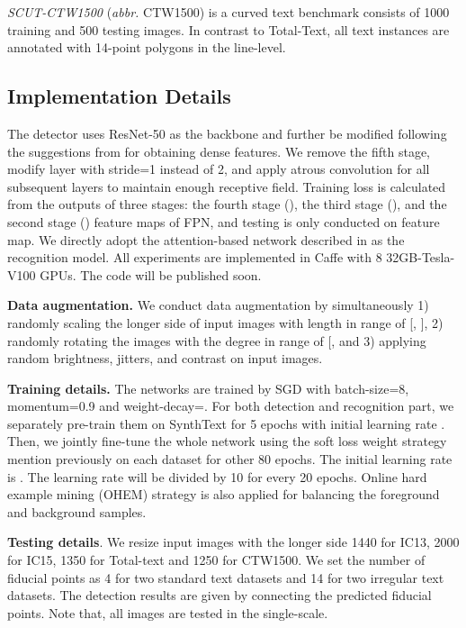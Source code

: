 \documentclass[letterpaper]{article} \usepackage{aaai20}  \usepackage{times}  \usepackage{helvet} \usepackage{courier}  \usepackage[hyphens]{url}  \usepackage{graphicx} \urlstyle{rm} \def\UrlFont{\rm}  \usepackage{graphicx}  \frenchspacing  \setlength{\pdfpagewidth}{8.5in}  \setlength{\pdfpageheight}{11in}  \usepackage{amsmath}
\begin{document}
\emph{SCUT-CTW1500} \cite{liu2019curved} (\emph{abbr.} CTW1500) is a curved text benchmark consists of 1000 training and 500 testing images.
In contrast to Total-Text, all text instances are annotated with 14-point polygons in the line-level.

\subsection{Implementation Details}

The detector uses ResNet-50 as the backbone and further be modified following the suggestions from \cite{huang2017speed} for obtaining dense features.
We remove the fifth stage, modify  layer with stride=1 instead of 2, and apply atrous convolution for all subsequent layers to maintain enough receptive field.
Training loss is calculated from the outputs of three stages: the fourth stage (), the third stage (), and the second stage () feature maps of FPN, and testing is only conducted on  feature map.
We directly adopt the attention-based network described in \cite{cheng2017focus} as the recognition model.
All experiments are implemented in Caffe with 8 32GB-Tesla-V100 GPUs. The code will be published soon.


\textbf{Data augmentation.}
We conduct data augmentation by simultaneously 1) randomly scaling the longer side of input images with length in range of [, ],  2) randomly rotating the images with the degree in range of [, and 3) applying random brightness, jitters, and contrast on input images.

\textbf{Training details.}
The networks are trained by SGD with batch-size=8, momentum=0.9 and weight-decay=. For both detection and recognition part, we separately pre-train them on SynthText for 5 epochs with initial learning rate . Then, we jointly fine-tune the whole network using the soft loss weight strategy mention previously on each dataset for other 80 epochs. The initial learning rate is  . The learning rate will be divided by 10 for every 20 epochs.
Online hard example mining (OHEM) \cite{shrivastava2016training} strategy is also applied for balancing the foreground and background samples.

\textbf{Testing details}.
We resize input images with the longer side 1440 for IC13, 2000 for IC15,  1350 for Total-text and 1250 for CTW1500.  We set the number of fiducial points as 4 for two standard text datasets and 14 for two irregular text datasets. The detection results are given by connecting the predicted fiducial points.
Note that, all images are tested in the single-scale.
\end{document}
